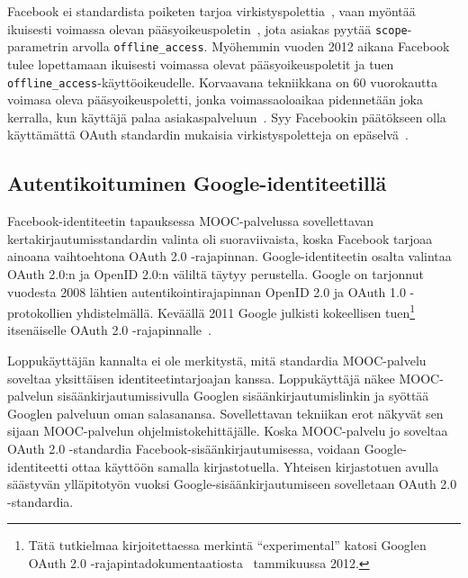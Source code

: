 \documentclass[finnish,gradu]{tktltiki}
\begin{document}
  Facebook ei standardista poiketen tarjoa virkistyspolettia~\cite{bradley_facebook_refresh_tokens_2012}, vaan myöntää ikuisesti voimassa olevan pääsyoikeuspoletin~\cite{facebook_oauth2_doc}, jota asiakas pyytää \verb!scope!-parametrin arvolla \verb!offline_access!. Myöhemmin vuoden 2012 aikana Facebook tulee lopettamaan ikuisesti voimassa olevat pääsyoikeuspoletit ja tuen \verb!offline_access!-käyttöoikeudelle. Korvaavana tekniikkana on 60 vuorokautta voimasa oleva pääsyoikeuspoletti, jonka voimassaoloaikaa pidennetään joka kerralla, kun käyttäjä palaa asiakaspalveluun~\cite{facebook_oauth2_deprecate_offline, facebook_oauth2_deprecate_offline_mailinglist}. Syy Facebookin päätökseen olla käyttämättä OAuth standardin mukaisia virkistyspoletteja on epäselvä~\cite{sakimura_facebook_refresh_tokens_2012}.




  \subsection{Autentikoituminen Google-identiteetillä} %
  \label{sub:mooc_google_auth}

  Facebook-identiteetin tapauksessa MOOC-palvelussa sovellettavan kertakirjautumisstandardin valinta oli suoraviivaista, koska Facebook tarjoaa ainoana vaihtoehtona OAuth 2.0 -rajapinnan. Google-identiteetin osalta valintaa OAuth 2.0:n ja OpenID 2.0:n väliltä täytyy perustella.
  Google on tarjonnut vuodesta 2008 lähtien autentikointirajapinnan OpenID 2.0 ja OAuth 1.0 -protokollien yhdistelmällä. Keväällä 2011 Google julkisti kokeellisen tuen\footnote{
  Tätä tutkielmaa kirjoitettaessa merkintä ``experimental'' katosi Googlen OAuth 2.0 -rajapintadokumentaatiosta~\cite{google_oauth2_doc} tammikuussa 2012.
  } itsenäiselle OAuth 2.0 -rajapinnalle~\cite{google_oauth2_announcement_2011}.

  Loppukäyttäjän kannalta ei ole merkitystä, mitä standardia MOOC-palvelu soveltaa yksittäisen identiteetintarjoajan kanssa. Loppukäyttäjä näkee MOOC-palvelun sisäänkirjautumissivulla Googlen sisäänkirjautumislinkin ja syöttää Googlen palveluun oman salasanansa. Sovellettavan tekniikan erot näkyvät sen sijaan MOOC-palvelun ohjelmistokehittäjälle. Koska MOOC-palvelu jo soveltaa OAuth 2.0 -standardia Facebook-sisäänkirjautumisessa, voidaan Google-identiteetti ottaa käyttöön samalla kirjastotuella. Yhteisen kirjastotuen avulla säästyvän ylläpitotyön vuoksi Google-sisäänkirjautumiseen sovelletaan OAuth 2.0 -standardia.
\end{document}
